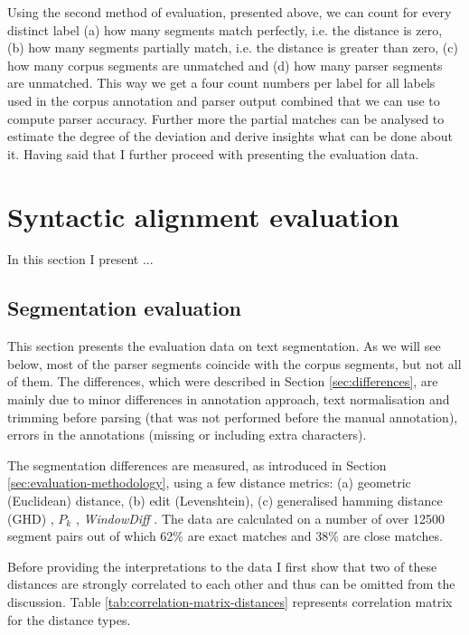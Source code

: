     Using the second method of evaluation, presented above, we can count for every distinct label (a) how many segments match perfectly, i.e. the distance is zero, (b) how many segments partially match, i.e. the distance is greater than zero, (c) how many corpus segments are unmatched and (d) how many parser segments are unmatched. This way we get a four count numbers per label for all labels used in the corpus annotation and parser output combined that we can use to compute parser accuracy. Further more the partial matches can be analysed to estimate the degree of the deviation and derive insights what can be done about it. Having said that I further proceed with presenting the evaluation data. 

\section{Syntactic alignment evaluation}
    In this section I present ...
    
\subsection{Segmentation evaluation}
\label{sec:segmentation-evaluation}
    
    This section presents the evaluation data on text segmentation. As we will see below, most of the parser segments coincide with the corpus segments, but not all of them. The differences, which were described in Section \ref{sec:differences}, are mainly due to minor differences in annotation approach, text normalisation and trimming before parsing (that was not performed before the manual annotation), errors in the annotations (missing or including extra characters). 
    
    The segmentation differences are measured, as introduced in Section \ref{sec:evaluation-methodology}, using a few distance metrics: (a) geometric (Euclidean) distance, (b) edit (Levenshtein), (c) generalised hamming distance (GHD) \citep{Bookstein2002}, $P_k$ \citep[198--200]{beeferman1999statistical}, \textit{WindowDiff} \citep[10]{pevzner2002critique}. 
    The data are calculated on a number of over 12500 segment pairs out of which 62\% are exact matches and 38\% are close matches. 
    
    Before providing the interpretations to the data I first show that two of these distances are strongly correlated to each other and thus can be omitted from the discussion. Table \ref{tab:correlation-matrix-distances} represents correlation matrix for the distance types. 
    
